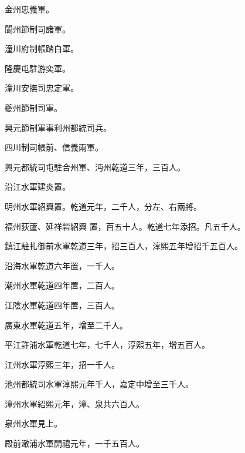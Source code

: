 \begin{pinyinscope}
 金州忠義軍。



 閬州節制司諸軍。



 潼川府制帳踏白軍。



 隆慶屯駐游奕軍。



 潼川安撫司忠定軍。



 夔州節制司軍。



 興元節制軍事利州都統司兵。



 四川制司帳前、信義兩軍。



 興元都統司屯駐合州軍、沔州乾道三年，三百人。



 沿江水軍建炎置。



 明州水軍紹興置。乾道元年，二千人，分左、右兩將。



 福州荻蘆、延祥砦紹興
 置，百五十人。乾道七年添招。凡五千人。



 鎮江駐扎御前水軍乾道三年，招三百人，淳熙五年增招千五百人。



 沿海水軍乾道六年置，一千人。



 潮州水軍乾道四年置，二百人。



 江陰水軍乾道四年置，三百人。



 廣東水軍乾道五年，增至二千人。



 平江許浦水軍乾道七年，七千人，淳熙五年，增五百人。



 江州水軍淳熙三年，招一千人。



 池州都統司水軍淳熙元年千人，嘉定中增至三千人。



 漳州水軍紹熙元年，漳、泉共六百人。



 泉州水軍見上。



 殿前澉浦水軍開禧元年，一千五百人。




\end{pinyinscope}

